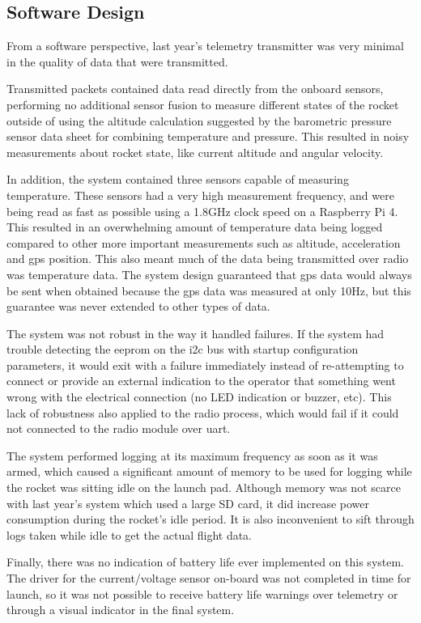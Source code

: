 \subsection{Software Design}

From a software perspective, last year's telemetry transmitter was very minimal in the quality of data that were
transmitted.

Transmitted packets contained data read directly from the onboard sensors, performing no additional sensor fusion to
measure different states of the rocket outside of using the altitude calculation suggested by the barometric pressure
sensor data sheet for combining temperature and pressure. This resulted in noisy measurements about rocket state, like
current altitude and angular velocity.

In addition, the system contained three sensors capable of measuring temperature. These sensors had a very high
measurement frequency, and were being read as fast as possible using a 1.8GHz clock speed on a Raspberry Pi 4. This
resulted in an overwhelming amount of temperature data being logged compared to other more important measurements such
as altitude, acceleration and \gls{gps} position. This also meant much of the data being transmitted over radio was
temperature data. The system design guaranteed that \gls{gps} data would always be sent when obtained because the
\gls{gps} data was measured at only 10Hz, but this guarantee was never extended to other types of data.

The system was not robust in the way it handled failures. If the system had trouble detecting the \gls{eeprom} on the
\gls{i2c} bus with startup configuration parameters, it would exit with a failure immediately instead of re-attempting
to connect or provide an external indication to the operator that something went wrong with the electrical connection
(no LED indication or buzzer, etc). This lack of robustness also applied to the radio process, which would fail if it
could not connected to the radio module over \gls{uart}.

The system performed logging at its maximum frequency as soon as it was armed, which caused a significant amount of
memory to be used for logging while the rocket was sitting idle on the launch pad. Although memory was not scarce with
last year's system which used a large SD card, it did increase power consumption during the rocket's idle period. It is
also inconvenient to sift through logs taken while idle to get the actual flight data.

Finally, there was no indication of battery life ever implemented on this system. The driver for the current/voltage
sensor on-board was not completed in time for launch, so it was not possible to receive battery life warnings over
telemetry or through a visual indicator in the final system.
